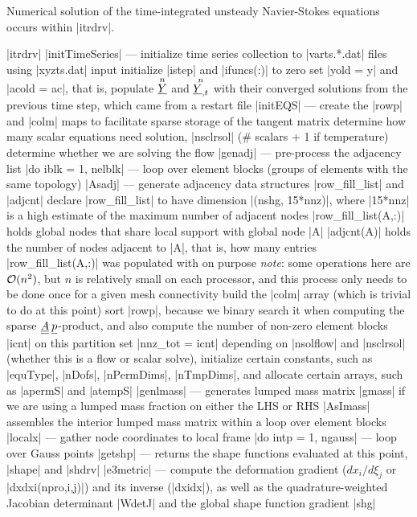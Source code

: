 \documentclass[11pt]{article}
\begin{document}
Numerical solution of the time-integrated unsteady Navier-Stokes equations occurs within |itrdrv|.
\begin{outline}[deep]
\1 |itrdrv|
	\2 |initTimeSeries| --- initialize time series collection to |varts.*.dat| files using |xyzts.dat| input
	\2 initialize |istep| and |ifuncs(:)| to zero
	\2 set |yold = y| and |acold = ac|, that is, populate $\oset{n}{\ul{Y}}$ and $\oset{n}{\ul{Y}_{,t}}$ with their converged solutions from the previous time step, which came from a restart file
	\2 |initEQS| --- create the |rowp| and |colm| maps to facilitate sparse storage of the tangent matrix
		\3 determine how many scalar equations need solution, |nsclrsol| (\# scalars + 1 if temperature)
		\3 determine whether we are solving the flow
		\3 |genadj| --- pre-process the adjacency list
			\4 |do iblk = 1, nelblk| --- loop over element blocks (groups of elements with the same topology)
				\5 |Asadj| --- generate adjacency data structures |row_fill_list| and |adjcnt|
					\6 declare |row_fill_list| to have dimension |(nshg, 15*nnz)|, where |15*nnz| is a high estimate of the maximum number of adjacent nodes
					\6 |row_fill_list(A,:)| holds global nodes that share local support with global node |A|
					\6 |adjcnt(A)| holds the number of nodes adjacent to |A|, that is, how many entries |row_fill_list(A,:)| was populated with on purpose
					\6 \emph{note}: some operations here are $\mathcal{O}(n^2)$, but $n$ is relatively small on each processor, and this process only needs to be done once for a given mesh connectivity
			\4 build the |colm| array (which is trivial to do at this point)
			\4 sort |rowp|, because we binary search it when computing the sparse $\underline{\underline{A}}\:\underline{p}$-product, and also compute the number of non-zero element blocks |icnt| on this partition
		\3 set |nnz_tot = icnt|
		\3 depending on |nsolflow| and |nsclrsol| (whether this is a flow or scalar solve), initialize certain constants, such as |equType|, |nDofs|, |nPermDims|, |nTmpDims|, and allocate certain arrays, such as |apermS| and |atempS|
	\2 |genlmass| --- generates lumped mass matrix |gmass| if we are using a lumped mass fraction on either the LHS or RHS
		\3 |AsImass| assembles the interior lumped mass matrix within a loop over element blocks
			\4 |localx| --- gather node coordinates to local frame
			\4 |do intp = 1, ngauss| --- loop over Gauss points
				\5 |getshp| --- returns the shape functions evaluated at this point, |shape| and |shdrv|
				\5 |e3metric| --- compute the deformation gradient ($dx_i/d\xi_j$ or |dxdxi(npro,i,j)|) and its inverse (|dxidx|), as well as the quadrature-weighted Jacobian determinant |WdetJ| and the global shape function gradient |shg|

\end{outline}
\end{document}
